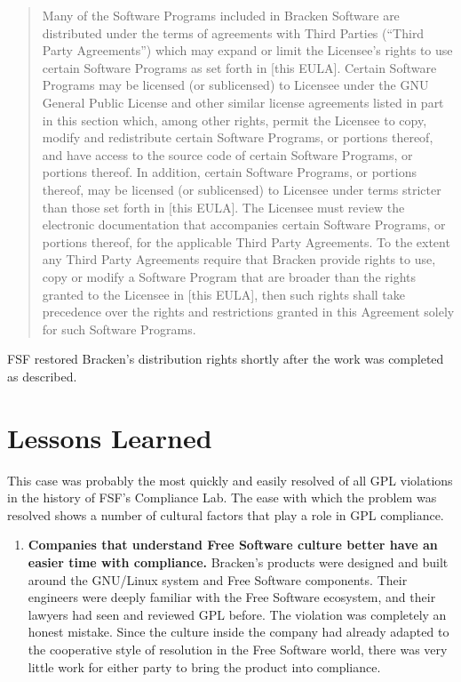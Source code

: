 {\begin{quotation}
Many of the Software Programs included in Bracken Software are distributed
under the terms of agreements with Third Parties (``Third Party
Agreements'') which may expand or limit the Licensee's rights to use
certain Software Programs as set forth in [this EULA]. Certain Software
Programs may be licensed (or sublicensed) to Licensee under the GNU
General Public License and other similar license agreements listed in part
in this section which, among other rights, permit the Licensee to copy,
modify and redistribute certain Software Programs, or portions thereof,
and have access to the source code of certain Software Programs, or
portions thereof. In addition, certain Software Programs, or portions
thereof, may be licensed (or sublicensed) to Licensee under terms stricter
than those set forth in [this EULA]. The Licensee must review the
electronic documentation that accompanies certain Software Programs, or
portions thereof, for the applicable Third Party Agreements. To the
extent any Third Party Agreements require that Bracken provide rights to
use, copy or modify a Software Program that are broader than the rights
granted to the Licensee in [this EULA], then such rights shall take
precedence over the rights and restrictions granted in this Agreement
solely for such Software Programs.
\end{quotation}

FSF restored Bracken's distribution rights shortly after the work was
completed as described.

\section{Lessons Learned}

This case was probably the most quickly and easily resolved of all GPL
violations in the history of FSF's Compliance Lab. The ease with which
the problem was resolved shows a number of cultural factors that play a
role in GPL compliance.

\begin{enumerate}

\item {\bf Companies that understand Free Software culture better have an
  easier time with compliance.}  Bracken's products were designed and
  built around the GNU/Linux system and Free Software components. Their
  engineers were deeply familiar with the Free Software ecosystem, and
  their lawyers had seen and reviewed GPL before. The violation was
  completely an honest mistake. Since the culture inside the company had
  already adapted to the cooperative style of resolution in the Free
  Software world, there was very little work for either party to bring the
  product into compliance.


\end{enumerate}}
